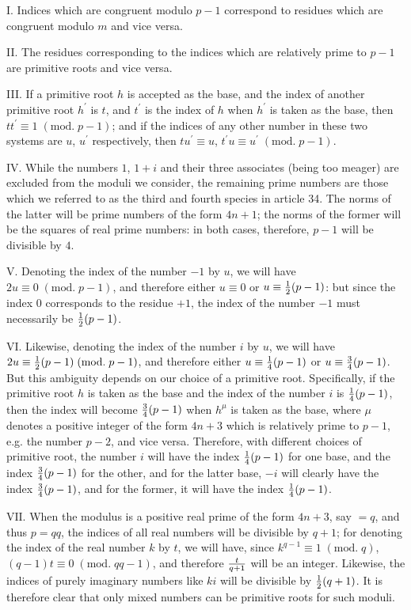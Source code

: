 \documentclass[twoside,12pt]{memoir}
\renewcommand{\pmod}[1]{\;(\textrm{mod.}\;#1)}
\let\oldfrac\frac
\def\frac#1#2{\mathchoice{\tfrac{#1}{#2}}{\oldfrac{#1}{#2}}{\genfrac{}{}{}{2}{#1}{#2\mathstrut}}{\genfrac{}{}{}{3}{#1}{#2\mathstrut}}}
\begin{document}
I. Indices which are congruent modulo \(p-1\) correspond to residues which are congruent modulo \(m\) and vice versa.

II. The residues corresponding to the indices which are relatively prime to \(p-1\) are primitive roots and vice versa.

III. If a primitive root \(h\) is accepted as the base, and the index of another primitive root \(h^{\prime}\) is \(t\), and \(t^{\prime}\) is the index of \(h\) when \(h^{\prime}\) is taken as the base, then \(t t^{\prime} \equiv 1\pmod{p-1}\); and if the  indices of any other number in these two systems are \(u\), \(u^{\prime}\) respectively, then \(t u^{\prime} \equiv u\), \(t^{\prime} u \equiv u^{\prime}\pmod{p-1}\).

IV. While the numbers \(1\), \(1+i\) and their three associates (being too meager) are excluded from the moduli we consider, the remaining prime numbers are those which we referred to as the third and fourth species in article 34. The norms of the latter will be prime numbers of the form \(4n+1\); the norms of the former will be the squares of real prime numbers: in both cases, therefore, \(p-1\) will be divisible by \(4\).
%

\(\text{V.}\) Denoting the index of the number \(-1\) by \(u\), we will have \(2 u \equiv 0\pmod{p-1}\), and therefore either \(u \equiv 0\) or \(u \equiv \frac{1}{2}(p-1)\): but since the index \(0\) corresponds to the residue \(+1\), the index of the number \(-1\) must necessarily be \(\frac{1}{2}(p-1)\).

\(\text{VI.}\) Likewise, denoting the index of the number \(i\) by \(u\), we will have \(2 u \equiv \frac{1}{2}(p-1) \pmod{p-1}\), and therefore either \(u \equiv \frac{1}{4}(p-1)\) or \(u \equiv \frac{3}{4}(p-1)\). But this ambiguity depends on our choice of a primitive root. Specifically, if the primitive root \(h\) is taken as the base and the index of the number \(i\) is \(\frac{1}{4}(p-1)\), then the index will become \(\frac{3}{4}(p-1)\) when \(h^{\mu}\) is taken as the base, where \(\mu\) denotes a positive integer of the form \(4 n+3\) which is relatively prime to \(p-1\), e.g. the number \(p-2\), and vice versa. Therefore, with different choices of primitive root, the number \(i\) will have the index \(\frac{1}{4}(p-1)\) for one base, and the index \(\frac{3}{4}(p-1)\) for the other, and for the latter base, \(-i\) will clearly have the index \(\frac{3}{4}(p-1)\), and for the former, it will have the index \(\frac{1}{4}(p-1)\).

\(\text{VII.}\) When the modulus is a positive real prime of the form \(4 n+3\), say \(=q\), and thus \(p=q q\), the indices of all real numbers will be divisible by \(q+1\); for denoting the index of the real number \(k\) by \(t\), we will have, since \(k^{q-1} \equiv 1\pmod{q}\), \((q-1) t \equiv 0\pmod{q q-1}\), and therefore \(\frac{t}{q+1}\) will be an integer. Likewise, the indices of purely imaginary numbers like \(ki\) will be divisible by \(\frac{1}{2}(q+1)\). It is therefore clear that only mixed numbers can be primitive roots for such moduli.
\end{document}

